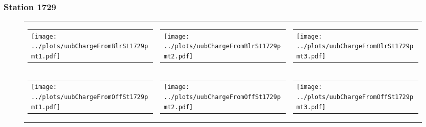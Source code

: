 \documentclass[aspectratio=169]{beamer}
\begin{document}
\begin{frame} 
  \frametitle{Station 1729}
 
  \begin{figure}
    \centering
    \begin{tabularx}{\textwidth}{LCR}
      \begin{tabular}{l}
        \texttt{[image: ../plots/uubChargeFromBlrSt1729pmt1.pdf]}
      \end{tabular}
      &
      \begin{tabular}{l}
        \texttt{[image: ../plots/uubChargeFromBlrSt1729pmt2.pdf]}
      \end{tabular}
      &
      \begin{tabular}{l}
        \texttt{[image: ../plots/uubChargeFromBlrSt1729pmt3.pdf]}
      \end{tabular}
      \\
      \begin{tabular}{l}
        \texttt{[image: ../plots/uubChargeFromOffSt1729pmt1.pdf]}
      \end{tabular}
      &
      \begin{tabular}{l}
        \texttt{[image: ../plots/uubChargeFromOffSt1729pmt2.pdf]}
      \end{tabular}
      &
      \begin{tabular}{l}
        \texttt{[image: ../plots/uubChargeFromOffSt1729pmt3.pdf]}
      \end{tabular}
    \end{tabularx}
  \end{figure}
\end{frame}
\end{document}
